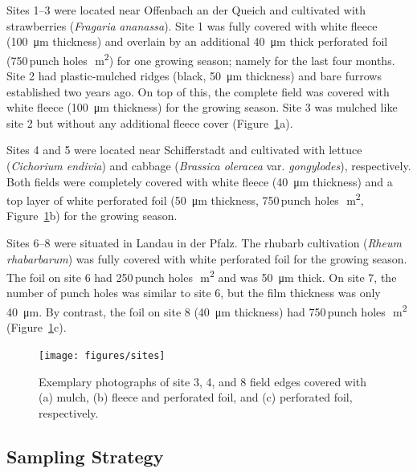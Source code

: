 Sites 1--3 were located near \foreignlanguage{ngerman}{Offenbach an der Queich} and cultivated with strawberries (\textit{Fragaria\,\texttimes\,ananassa}). Site 1 was fully covered with white fleece (\SI{100}{\micro\meter} thickness) and overlain by an additional \SI{40}{\micro\meter} thick perforated foil (750\,punch holes\,\si{\per\meter\squared}) for one growing season; namely for the last four months. Site 2 had plastic-mulched ridges (black, \SI{50}{\micro\meter} thickness) and bare furrows established two years ago. On top of this, the complete field was covered with white fleece (\SI{100}{\micro\meter} thickness) for the growing season. Site 3 was mulched like site 2 but without any additional fleece cover (Figure~\ref{fig:sites}a).

Sites 4 and 5 were located near \foreignlanguage{ngerman}{Schifferstadt} and cultivated with lettuce (\textit{Cichorium endivia}) and cabbage (\textit{Brassica oleracea} var. \textit{gongylodes}), respectively. Both fields were completely covered with white fleece (\SI{40}{\micro\meter} thickness) and a top layer of white perforated foil (\SI{50}{\micro\meter} thickness, \num{750}\,punch holes\,\si{\per\meter\squared}, Figure~\ref{fig:sites}b) for the growing season.

Sites 6--8 were situated in \foreignlanguage{ngerman}{Landau in der Pfalz}. The rhubarb cultivation (\textit{Rheum rhabarbarum}) was fully covered with white perforated foil for the growing season. The foil on site 6 had 250\,punch holes\,\si{\per\meter\squared} and was \SI{50}{\micro\meter} thick. On site 7, the number of punch holes was similar to site 6, but the film thickness was only \SI{40}{\micro\meter}. By contrast, the foil on site 8 (\SI{40}{\micro\meter} thickness) had \num{750}\,punch holes\,\si{\per\meter\squared} (Figure~\ref{fig:sites}c).

\begin{figure}
	\centering
	\texttt{[image: figures/sites]}
	\caption[Exemplary photographs of the experimental sites.]{Exemplary photographs of site 3, 4, and 8 field edges covered with (a) mulch, (b) fleece and perforated foil, and (c) perforated foil, respectively.}
	\label{fig:sites}
\end{figure}

\subsection{Sampling Strategy}

